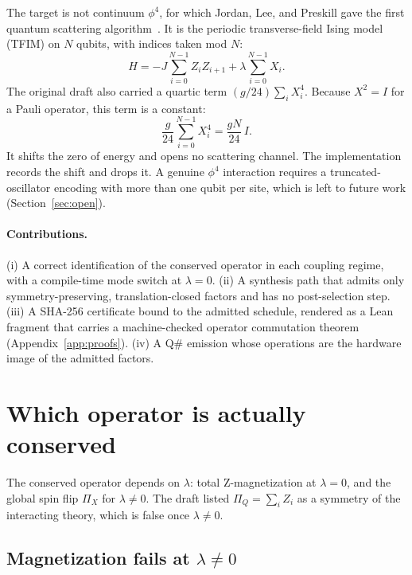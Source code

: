 \documentclass[11pt]{article}
\theoremstyle{definition}
\newcommand{\PiX}{\Pi_X}
\begin{document}
The target is not continuum $\phi^4$, for which Jordan, Lee, and Preskill gave the first quantum scattering algorithm~\cite{jlp2012,jlp2014}. It is the periodic transverse-field Ising model (TFIM) on $N$ qubits, with indices taken mod $N$:
\begin{equation}
  H = -J \sum_{i=0}^{N-1} Z_i Z_{i+1} + \lambda \sum_{i=0}^{N-1} X_i .
  \label{eq:H}
\end{equation}
The original draft also carried a quartic term $(g/24)\sum_i X_i^4$. Because $X^2 = I$ for a Pauli operator, this term is a constant:
\begin{equation}
  \frac{g}{24}\sum_{i=0}^{N-1} X_i^4 = \frac{gN}{24}\, I .
\end{equation}
It shifts the zero of energy and opens no scattering channel. The implementation records the shift and drops it. A genuine $\phi^4$ interaction requires a truncated-oscillator encoding with more than one qubit per site, which is left to future work (Section~\ref{sec:open}).

\paragraph{Contributions.}
(i) A correct identification of the conserved operator in each coupling regime, with a compile-time mode switch at $\lambda = 0$.
(ii) A synthesis path that admits only symmetry-preserving, translation-closed factors and has no post-selection step.
(iii) A SHA-256 certificate bound to the admitted schedule, rendered as a Lean fragment that carries a machine-checked operator commutation theorem (Appendix~\ref{app:proofs}).
(iv) A Q\# emission whose operations are the hardware image of the admitted factors.

\section{Which operator is actually conserved}
\label{sec:symmetry}

The conserved operator depends on $\lambda$: total Z-magnetization at $\lambda = 0$, and the global spin flip $\PiX$ for $\lambda \neq 0$. The draft listed $\Pi_Q = \sum_i Z_i$ as a symmetry of the interacting theory, which is false once $\lambda \neq 0$.

\subsection{Magnetization fails at \texorpdfstring{$\lambda \neq 0$}{lambda != 0}}
\end{document}
